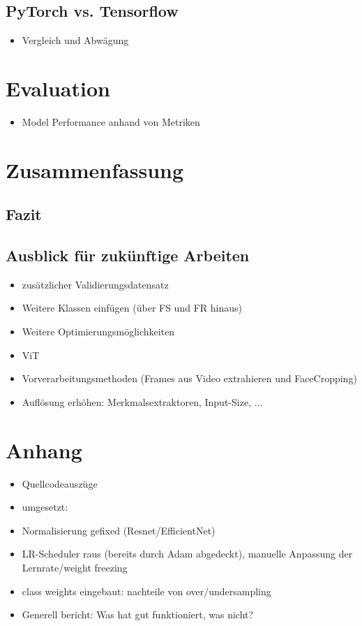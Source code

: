 \documentclass{article}
\begin{document}
    \subsection{PyTorch vs. Tensorflow}
    \begin{itemize}
        \item Vergleich und Abwägung
    \end{itemize}
    \section{Evaluation}
    \begin{itemize}
        \item Model Performance anhand von Metriken
    \end{itemize}

    \section{Zusammenfassung}
    \subsection{Fazit}
    \subsection{Ausblick für zukünftige Arbeiten}
    \begin{itemize}
        \item zusätzlicher Validierungsdatensatz %
        \item Weitere Klassen einfügen (über FS und FR hinaus)
        \item Weitere Optimierungsmöglichkeiten
        \item ViT
        \item Vorverarbeitungsmethoden (Frames aus Video extrahieren und FaceCropping)
        \item Auflösung erhöhen: Merkmalsextraktoren, Input-Size, ...
    \end{itemize}

    
    

    \section*{Anhang}
    \begin{itemize}
        \item Quellcodeauszüge
        \item umgesetzt:
        \item Normalisierung gefixed (Resnet/EfficientNet)
        \item LR-Scheduler raus (bereits durch Adam abgedeckt), manuelle Anpassung der Lernrate/weight freezing
        \item class weights eingebaut: nachteile von over/undersampling
        \item Generell bericht: Was hat gut funktioniert, was nicht?
    \end{itemize}
\end{document}
